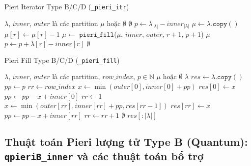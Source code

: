 \begin{algorithm}[H]
        \caption{Pieri Iterator Type B/C/D (\texttt{\_pieri\_itr})}
        \begin{algorithmic}[1]
        \REQUIRE $\lambda$, $inner$, $outer$ là các partition
        \ENSURE $\mu$ hoặc $\emptyset$
        \IF{$\lambda = \emptyset$}
            \RETURN $\emptyset$
        \ENDIF
        \STATE $p \gets \lambda_{|\lambda|} - inner_{|\lambda|}$
                \STATE $\mu \gets \lambda.\mathtt{copy}()$
                \STATE $\mu[r] \gets \mu[r] - 1$
                \STATE $\mu \gets$ $\mathtt{pieri\_fill}$($\mu$, $inner$, $outer$, $r+1$, $p+1$)
                \IF{$\mu \neq \emptyset$}
                    \RETURN $\mu$
                \ENDIF
            \ENDIF
            \STATE $p \gets p + \lambda[r] - inner[r]$
        \ENDFOR
        \RETURN $\emptyset$
        \end{algorithmic}
        \end{algorithm}


\begin{algorithm}[H]
\caption{Pieri Fill Type B/C/D (\texttt{\_pieri\_fill})}
\begin{algorithmic}[1]
\REQUIRE $\lambda$, $inner$, $outer$ là các partition, $row\_index$, $p \in \mathbb{N}$
\ENSURE $\mu$ hoặc $\emptyset$
\IF{$\lambda = \emptyset$}
    \RETURN $\lambda$
\ENDIF
\STATE $res \gets \lambda.\mathtt{copy}()$
\STATE $pp \gets p$
\STATE $rr \gets row\_index$
    \STATE $x \gets \min(outer[0], inner[0] + pp)$
    \STATE $res[0] \gets x$
    \STATE $pp \gets pp - x + inner[0]$
    \STATE $rr \gets 1$
\ENDIF
{}
    \STATE $x \gets \min(outer[rr], inner[rr] + pp, res[rr-1])$
    \STATE $res[rr] \gets x$
    \STATE $pp \gets pp - x + inner[rr]$
    \STATE $rr \gets rr + 1$
\ENDWHILE
{}
    \RETURN $\emptyset$
\ENDIF
\RETURN $res[:|\lambda|]$
\end{algorithmic}
\end{algorithm}        


\subsection*{Thuật toán Pieri lượng tử Type B (Quantum): \texttt{qpieriB\_inner} và các thuật toán bổ trợ}

